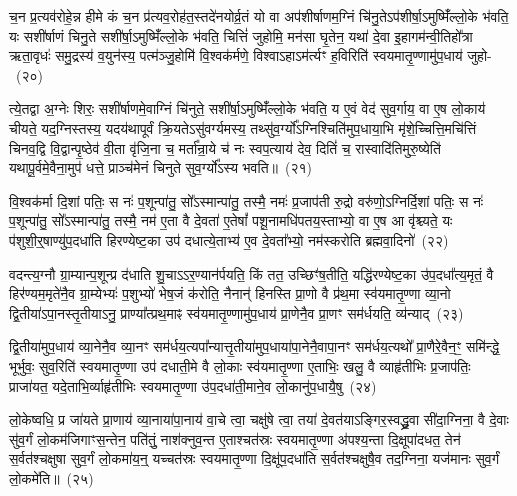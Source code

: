च॒न प्र॒त्यव॑रोहे॒न्न हीमे कं च॒न प्र॑त्यव॒रोह॑त॒स्तदे॑नयोर्व्र॒तं यो वा अप॑शीर्\mbox{}षाणम॒ग्निं चि॑नु॒ते\-ऽप॑शीर्\mbox{}षा॒\-ऽमुष्मिँ॑ल्लो॒के भ॑वति॒ यः सशी॑र्\mbox{}षाणं चिनु॒ते सशी॑र्\mbox{}षा॒\-ऽमुष्मिँ॑ल्लो॒के भ॑वति॒ चित्तिं॑ जुहोमि॒ मन॑सा घृ॒तेन॒ यथा॑ दे॒वा इ॒हागम॑न्वी॒तिहो᳚त्रा ऋता॒वृधः॑ समु॒द्रस्य॑ व॒युन॑स्य॒ पत्म॑ञ्जु॒होमि॑ वि॒श्वक॑र्मणे॒ विश्वा\-ऽहा\-ऽम॑र्त्यꣳ ह॒विरिति॑ स्वयमा\-तृ॒ण्णामु॑प॒धाय॑ जुहो-~(२०)\ip

त्ये॒तद्वा अ॒ग्नेः शिरः॒ सशी॑र्\mbox{}षाणमे॒वाग्निं चि॑नुते॒ सशी॑र्\mbox{}षा॒\-ऽमुष्मिँ॑ल्लो॒के भ॑वति॒ य ए॒वं वेद॑ सुव॒र्गाय॒ वा ए॒ष लो॒काय॑ चीयते॒ यद॒ग्निस्तस्य॒ यदय॑थापूर्वं क्रि॒यते\-ऽसु॑वर्ग्यमस्य॒ तथ्सु॑व॒र्ग्यो᳚\-ऽग्निश्चिति॑मुप॒धाया॒भि मृ॑शे॒च्चित्ति॒मचि॑त्तिं चिनव॒द्वि वि॒द्वान्पृ॒ष्ठेव॑ वी॒ता वृ॑जि॒ना च॒ मर्ता᳚न्रा॒ये च॑ नः स्वप॒त्याय॑ देव॒ दितिं॑ च॒ रास्वादि॑तिमुरु॒ष्येति॑ यथापू॒र्वमे॒वैना॒मुप॑ धत्ते॒ प्राञ्च॑मेनं चिनुते सुव॒र्ग्यो᳚\-ऽस्य भवति॥~(२१)\ip

{\anuvakamend[{ओष॑धयः॒ कञ्जु॑होति स्वप॒त्याया॒ष्टाद॑श च}]}

वि॒श्वक॑र्मा दि॒शां पतिः॒ स नः॑ प॒शून्पा॑तु॒ सो᳚\-ऽस्मान्पा॑तु॒ तस्मै॒ नमः॑ प्र॒जा\-प॑ती रु॒द्रो वरु॑णो॒\-ऽग्निर्दि॒शां पतिः॒ स नः॑ प॒शून्पा॑तु॒ सो᳚\-ऽस्मान्पा॑तु॒ तस्मै॒ नम॑ ए॒ता वै दे॒वता॑ ए॒तेषां᳚ पशू॒नामधि॑पतय॒स्ताभ्यो॒ वा ए॒ष आ वृ॑श्च्यते॒ यः प॑शुशी॒र्॒\mbox{}षाण्यु॑प॒\-दधा॑ति हिरण्येष्ट॒का उप॑ दधात्ये॒ताभ्य॑ ए॒व दे॒वता᳚भ्यो॒ नम॑स्करोति ब्रह्मवा॒दिनो॑~(२२)\ip

वदन्त्य॒ग्नौ ग्रा॒म्यान्प॒शून्प्र द॑धाति शु॒चा\-ऽऽर॒ण्यान॑र्पयति॒ किं तत॒ उच्छिꣳ॑ष॒तीति॒ यद्धि॑रण्येष्ट॒का उ॑प॒दधा᳚त्य॒मृतं॒ वै हिर॑ण्यम॒मृते॑नै॒व ग्रा॒म्येभ्यः॑ प॒शुभ्यो॑ भेष॒जं क॑रोति॒ नैनान्॑ हिनस्ति प्रा॒णो वै प्र॑थ॒मा स्व॑यमातृ॒ण्णा व्या॒नो द्वि॒तीया॑\-ऽपा॒नस्तृ॒तीया\-ऽनु॒ प्राण्या᳚त्प्रथ॒माꣴ स्व॑यमातृ॒ण्णामु॑प॒धाय॑ प्रा॒णेनै॒व प्रा॒णꣳ सम॑र्धयति॒ व्य॑न्याद्~(२३)\ip

द्वि॒तीया॑मुप॒धाय॑ व्या॒नेनै॒व व्या॒नꣳ सम॑र्धय॒त्यपा᳚न्यात्तृ॒तीया॑मुप॒धाया॑पा॒नेनै॒वापा॒नꣳ सम॑र्धय॒त्यथो᳚ प्रा॒णैरे॒वैन॒ꣳ॒ समि॑न्द्धे॒ भूर्भुवः॒ सुव॒रिति॑ स्वयमा\-तृ॒ण्णा उप॑ दधाती॒मे वै लो॒काः स्व॑यमातृ॒ण्णा ए॒ताभिः॒ खलु॒ वै व्याहृ॑तीभिः प्र॒जा\-प॑तिः॒ प्राजा॑यत॒ यदे॒ताभि॒र्व्याहृ॑तीभिः स्वयमा\-तृ॒ण्णा उ॑प॒\-दधा॑ती॒माने॒व लो॒कानु॑प॒धायै॒षु~(२४)\ip

लो॒केष्वधि॒ प्र जा॑यते प्रा॒णाय॑ व्या॒नाया॑पा॒नाय॑ वा॒चे त्वा॒ चक्षु॑षे त्वा॒ तया॑ दे॒वत॑या\-ऽ\-ङ्गिर॒स्वद्ध्रु॒वा सी॑दा॒ग्निना॒ वै दे॒वाः सु॑व॒र्गं लो॒कम॑जिगाꣳस॒न्तेन॒ पति॑तुं॒ नाश॑क्नुव॒न्त ए॒ताश्चत॑स्रः स्वयमा\-तृ॒ण्णा अ॑पश्य॒न्ता दि॒क्षूपा॑दधत॒ तेन॑ स॒र्वत॑श्चक्षुषा सुव॒र्गं लो॒कमा॑य॒न्॒ यच्चत॑स्रः स्वयमा\-तृ॒ण्णा दि॒क्षू॑प॒\-दधा॑ति स॒र्वत॑श्चक्षुषै॒व तद॒ग्निना॒ यज॑मानः सुव॒र्गं लो॒कमे॑ति॥~(२५)\ip

